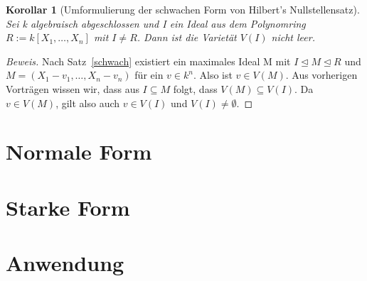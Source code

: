 \documentclass{article}
\newtheorem{korollar}[satz]{Korollar}
\begin{document}
	\begin{korollar}[Umformulierung der schwachen Form von Hilbert's Nullstellensatz]
	Sei k algebraisch abgeschlossen und I ein Ideal aus dem Polynomring \(R :=
	k[X_1,\ldots,X_n]\) mit \(I \neq R\). Dann ist die Varietät \(V(I)\) nicht leer.
	\end{korollar}

	\begin{proof}[Beweis]
	Nach Satz~\ref{schwach} existiert ein maximales Ideal M mit \(I \unlhd M \unlhd R\)
	und \(M = (X_1 - v_1, \ldots, X_n - v_n)\) für ein \(v \in k^n\). Also ist
	\(v \in V(M)\). Aus vorherigen Vorträgen wissen wir, dass aus \(I \subseteq M\) folgt,
	dass \(V(M) \subseteq V(I)\). Da \(v \in V(M)\), gilt also auch \(v \in V(I)\)
	und \(V(I) \neq \emptyset\).
	\end{proof}


\section{Normale Form}
\section{Starke Form}
\section{Anwendung}
\end{document}
